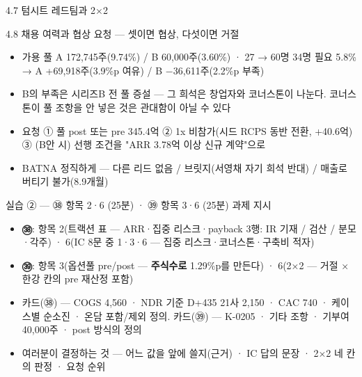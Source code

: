 \begin{frame}{4.7 텀시트 레드팀과 2×2}
\end{frame}

\begin{frame}{4.8 채용 여력과 협상 요청 — 셋이면 협상, 다섯이면 거절}
\begin{itemize}
\item 가용 풀 A 172,745주(9.74\%) / B 60,000주(3.60\%) · 27 → 60명 34명 필요 5.8\% → A +69,918주(3.9\%p 여유) / B $-$36,611주(2.2\%p 부족)
\item B의 부족은 시리즈B 전 풀 증설 — 그 희석은 창업자와 코너스톤이 나눈다. 코너스톤이 풀 조항을 안 넣은 것은 관대함이 아닐 수 있다
\item 요청 ① 풀 post 또는 pre 345.4억 ② 1x 비참가(시드 RCPS 동반 전환, +40.6억) ③ (B안 시) 선행 조건을 "ARR 3.78억 이상 신규 계약"으로
\item BATNA 정직하게 — 다른 리드 없음 / 브릿지(서영채 자기 희석 반대) / 매출로 버티기 불가(8.9개월)
\end{itemize}
\end{frame}

\begin{frame}{실습 ② — ㊳ 항목 2·6 (25분) · ㊴ 항목 3·6 (25분) 과제 지시}
\begin{itemize}
\item \textbf{㊳}: 항목 2(트랙션 표 — ARR·집중 리스크·payback 3행: IR 기재 / 검산 / 분모·각주) · 6(IC 8문 중 1·3·6 — 집중 리스크·코너스톤·구축비 적자)
\item \textbf{㊴}: 항목 3(옵션풀 pre/post — \textbf{주식수로} 1.29\%p를 만든다) · 6(2×2 — 거절 × 한강 칸의 pre 재산정 포함)
\item 카드(㊳) — COGS 4,560 · NDR 기준 D+435 21사 2,150 · CAC 740 · 케이스별 순소진 · 온담 포함/제외 정의. 카드(㊴) — K-02\til{}05 · 기타 조항 · 기부여 40,000주 · post 방식의 정의
\item 여러분이 결정하는 것 — 어느 값을 앞에 쓸지(근거) · IC 답의 문장 · 2×2 네 칸의 판정 · 요청 순위
\end{itemize}
\end{frame}

